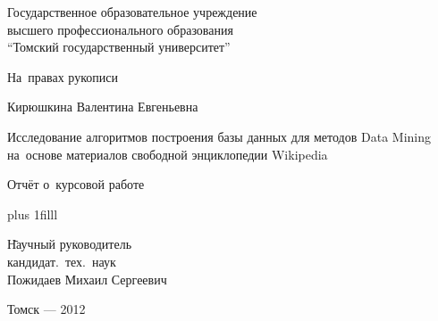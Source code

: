 
\thispagestyle{empty}
\begin{center}
Государственное образовательное учреждение\\
высшего профессионального образования\\
``Томский государственный университет''
\end{center}

\vspace{1cm}

\begin{flushright}
На~правах рукописи
\end{flushright}

\vspace{1cm}

\begin{center}

Кирюшкина Валентина Евгеньевна

\vspace{1cm}

Исследование алгоритмов построения базы данных для методов Data Mining\\
на~основе материалов свободной энциклопедии Wikipedia

\vspace{2.0cm}

Отчёт о~курсовой работе

\end{center}

\vskip 0pt plus 1filll

\begin{tabbing}
\hspace{10cm} \= Научный руководитель\\
\> кандидат.~тех.~наук\\
\> Пожидаев Михаил Сергеевич\\
\end{tabbing}

\vspace*{1cm}

\begin{center}
Томск --- 2012
\end{center}
